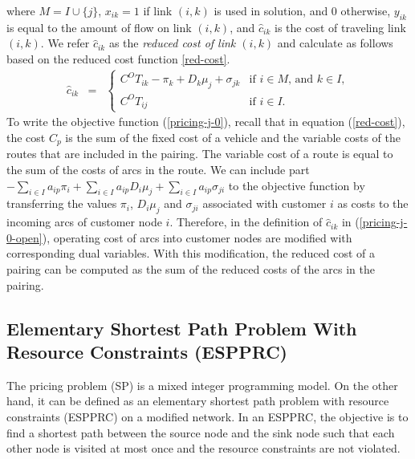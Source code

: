 where $M = I \cup \{j\}$, $x_{ik} = 1$ if link $(i,k)$ is used in solution, 
and 0 otherwise, $y_{ik}$ is equal to the amount of flow on link $(i,k)$,
and $\hat{c}_{ik}$ is the cost of traveling link $(i,k)$. 
We refer  $\hat{c}_{ik}$ as the {\em reduced cost of link $(i,k)$} and calculate
as follows based on the reduced cost function \ref{red-cost}. 
\begin{eqnarray}
\hat{c}_{ik} & = & \left \{  \begin{array}{ll}
                 C^O T_{ik}-\pi_{k} + D_k \mu_j + \sigma_{jk} & \mbox{if $i \in M$, and $k \in I$}, \\
                 C^OT_{ij} & \mbox{if $i \in I$}.
                 \end{array}
              \right. \label{pricing-j-0-open}
\end{eqnarray}
To write the objective function (\ref{pricing-j-0}), recall that in equation 
(\ref{red-cost}), the cost $C_{p}$ is the sum of the fixed cost of a vehicle 
and the variable costs of the routes that are included in the pairing. The variable 
cost of a route is equal to the sum of the costs of arcs in the route. 
We can include part
$-\sum_{i\in I}a_{ip} \pi_{i}+\sum_{i \in I}a_{ip} D_{i} \mu_{j}+\sum_{i \in I} a_{ip} \sigma_{ji}$
to the objective function by transferring the values $\pi_i$, $D_{i} \mu_{j}$ and $\sigma_{ji}$ 
associated with customer $i$ as costs to the incoming arcs of customer node $i$. 
Therefore, in the definition of $\hat{c}_{ik}$ in (\ref{pricing-j-0-open}),
operating cost of arcs into customer nodes are modified with corresponding dual variables.
With this modification, the reduced cost of a pairing can be computed as the 
sum of the reduced costs of the arcs in the pairing.     


\subsection{Elementary Shortest Path Problem With Resource Constraints (ESPPRC)}
The pricing problem (SP) is a mixed integer programming model. On the other hand,
it  can be defined as an elementary shortest path problem with resource 
constraints (ESPPRC) on a modified network. In an ESPPRC, the objective is to find a 
shortest path between the source node and the sink node such that each other node 
is visited at most once and the resource constraints are not violated. 

